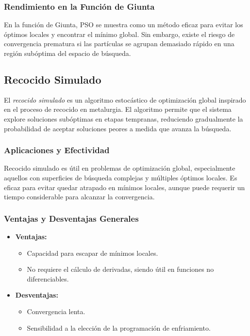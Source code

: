 \documentclass[fontsize=10pt]{article}
\begin{document}
\subsubsection{Rendimiento en la Función de Giunta}

En la función de Giunta, PSO se muestra como un método eficaz para evitar los óptimos locales y encontrar el mínimo global. Sin embargo, existe el riesgo de convergencia prematura si las partículas se agrupan demasiado rápido en una región subóptima del espacio de búsqueda.

\subsection{Recocido Simulado}

El \textit{recocido simulado} es un algoritmo estocástico de optimización global inspirado en el proceso de recocido en metalurgia. El algoritmo permite que el sistema explore soluciones subóptimas en etapas tempranas, reduciendo gradualmente la probabilidad de aceptar soluciones peores a medida que avanza la búsqueda.

\subsubsection{Aplicaciones y Efectividad}

Recocido simulado es útil en problemas de optimización global, especialmente aquellos con superficies de búsqueda complejas y múltiples óptimos locales. Es eficaz para evitar quedar atrapado en mínimos locales, aunque puede requerir un tiempo considerable para alcanzar la convergencia.

\subsubsection{Ventajas y Desventajas Generales}

\begin{itemize}
    \item \textbf{Ventajas:} 
    \begin{itemize}
        \item Capacidad para escapar de mínimos locales.
        \item No requiere el cálculo de derivadas, siendo útil en funciones no diferenciables.
    \end{itemize}
    \item \textbf{Desventajas:} 
    \begin{itemize}
        \item Convergencia lenta.
        \item Sensibilidad a la elección de la programación de enfriamiento.
    \end{itemize}
\end{itemize}
\end{document}
